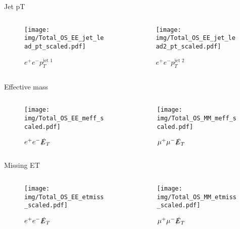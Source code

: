 \documentclass{beamer}
\begin{document}

\begin{frame}{Jet pT}
  \begin{columns}
    \begin{column}{0.45\textwidth}\begin{figure}
      \caption{$e^{+}e^{-}p_{T}^{\text{jet 1}}$}
      \texttt{[image: img/Total\_OS\_EE\_jet\_lead\_pt\_scaled.pdf]}
    \end{figure}\end{column}
    \begin{column}{0.45\textwidth}\begin{figure}
      \caption{$e^{+}e^{-}p_{T}^{\text{jet 2}}$}
      \texttt{[image: img/Total\_OS\_EE\_jet\_lead2\_pt\_scaled.pdf]}
    \end{figure}\end{column}
  \end{columns}
\end{frame}

\begin{frame}{Effective mass}
  \begin{columns}
    \begin{column}{0.45\textwidth}\begin{figure}
      \caption{$e^{+}e^{-}\slashed{E}_{T}$}
      \texttt{[image: img/Total\_OS\_EE\_meff\_scaled.pdf]}
    \end{figure}\end{column}
    \begin{column}{0.45\textwidth}\begin{figure}
      \caption{$\mu^{+}\mu^{-}\slashed{E}_{T}$}
      \texttt{[image: img/Total\_OS\_MM\_meff\_scaled.pdf]}
    \end{figure}\end{column}
  \end{columns}
\end{frame}

\begin{frame}{Missing ET}
  \begin{columns}
    \begin{column}{0.45\textwidth}\begin{figure}
      \caption{$e^{+}e^{-}\slashed{E}_{T}$}
      \texttt{[image: img/Total\_OS\_EE\_etmiss\_scaled.pdf]}
    \end{figure}\end{column}
    \begin{column}{0.45\textwidth}\begin{figure}
      \caption{$\mu^{+}\mu^{-}\slashed{E}_{T}$}
      \texttt{[image: img/Total\_OS\_MM\_etmiss\_scaled.pdf]}
    \end{figure}\end{column}
  \end{columns}
\end{frame}
\end{document}
